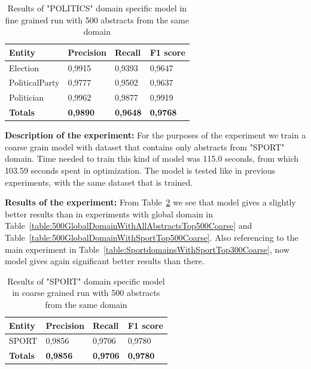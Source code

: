 \documentclass[thesis=M,english]{FITthesis}[2018/05/30]
\begin{document}
	\begin{table}[H]\centering
		\begin{tabular}{|l|l|l|l|}
			\hline {\textbf{Entity}} & {\textbf{Precision}} & {\textbf{Recall}} & {\textbf{F1 score}}\\\hline
				Election & 0,9915 & 0,9393 & 0,9647\\
				PoliticalParty & 0,9777 & 0,9502 & 0,9637\\
				Politician & 0,9962 & 0,9877 & 0,9919\\\hline
				\textbf{Totals} & \textbf{0,9890} & \textbf{0,9648} & \textbf{0,9768}\\\hline
		\end{tabular}
		\caption{Results of "POLITICS" domain specific model in fine grained run with 500 abstracts from the same domain \label{table:500PoliticsDomainWithPoliticsTop500Fine}}
	\end{table}	
	

	\textbf{Description of the experiment:} For the purposes of the experiment we train a coarse grain model with dataset that contains only abstracts from "SPORT" domain. Time needed to train this kind of model was 115.0 seconds, from which 103.59 seconds spent in optimization. The model is tested like in previous experiments, with the same dataset that is trained.

	\textbf{Results of the experiment:} From Table~\ref{table:500SportDomainWithSportTop500Coarse} we see that model gives a slightly better results than in experiments with global domain in Table~\ref{table:500GlobalDomainWithAllAbstractsTop500Coarse} and Table~\ref{table:500GlobalDomainWithSportTop500Coarse}. Also referencing to the main experiment in Table~\ref{table:SportdomainsWithSportTop300Coarse}, now model gives again significant better results than there.

	\begin{table}[H]\centering
		\begin{tabular}{|l|l|l|l|}
			\hline {\textbf{Entity}} & {\textbf{Precision}} & {\textbf{Recall}} & {\textbf{F1 score}}\\\hline
				SPORT & 0,9856 & 0,9706 & 0,9780\\\hline
				\textbf{Totals} & \textbf{0,9856} & \textbf{0,9706} & \textbf{0,9780}\\\hline
		\end{tabular}
		\caption{Results of "SPORT" domain specific model in coarse grained run with 500 abstracts from the same domain \label{table:500SportDomainWithSportTop500Coarse}}
	\end{table}
\end{document}
